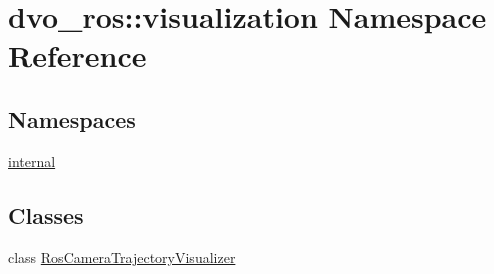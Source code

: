 \hypertarget{namespacedvo__ros_1_1visualization}{}\section{dvo\+\_\+ros\+:\+:visualization Namespace Reference}
\label{namespacedvo__ros_1_1visualization}
\subsection*{Namespaces}
\begin{DoxyCompactItemize}
\item 
 \mbox{\hyperlink{namespacedvo__ros_1_1visualization_1_1internal}{internal}}
\end{DoxyCompactItemize}
\subsection*{Classes}
\begin{DoxyCompactItemize}
\item 
class \mbox{\hyperlink{classdvo__ros_1_1visualization_1_1_ros_camera_trajectory_visualizer}{Ros\+Camera\+Trajectory\+Visualizer}}
\end{DoxyCompactItemize}
